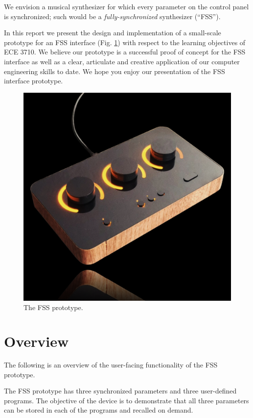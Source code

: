 \documentclass[conference]{IEEEtran}
\begin{document}
We envision a musical synthesizer for which every parameter on the control panel is synchronized; such would be a \textit{fully-synchronized} synthesizer (``FSS'').

In this report we present the design and implementation of a small-scale prototype for an FSS interface (Fig. \ref{fig:fss_cover_art}) with respect to the learning objectives of ECE 3710. We believe our prototype is a successful proof of concept for the FSS interface as well as a clear, articulate and creative application of our computer engineering skills to date. We hope you enjoy our presentation of the FSS interface prototype.

\begin{figure}[h]
    \centering
    \includegraphics[scale=0.27]{./resources/figures/fss_cover_art.png}
    \caption{The FSS prototype.}
    \label{fig:fss_cover_art}
\end{figure}

\section{Overview}

The following is an overview of the user-facing functionality of the FSS prototype.

The FSS prototype has three synchronized parameters and three user-defined programs. The objective of the device is to demonstrate that all three parameters can be stored in each of the programs and recalled on demand.
\end{document}
